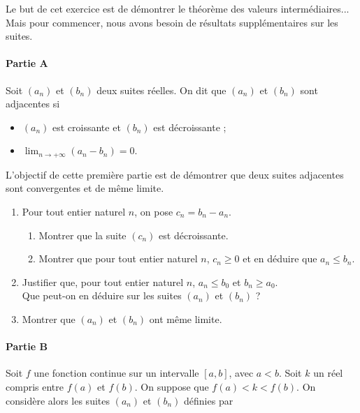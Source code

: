 \documentclass[11pt,fleqn, openany]{book} %
\begin{document}
\begin{exercise}[topic=cont03, subtitle={(Démontrer le théorème des valeurs intermédiaires)}]

Le but de cet exercice est de démontrer le théorème des valeurs intermédiaires... Mais pour commencer, nous avons besoin de résultats supplémentaires sur les suites.

\paragraph{Partie A}

Soit $(a_n)$ et $(b_n)$ deux suites réelles. On dit que $(a_n)$ et $(b_n)$ sont adjacentes si
\begin{itemize}
\item $(a_n)$ est croissante et $(b_n)$ est décroissante ;
\item $\displaystyle \lim_{n \to + \infty} (a_n-b_n)=0$.
\end{itemize}
L'objectif de cette première partie est de démontrer que deux suites adjacentes sont convergentes et de même limite.

\begin{enumerate}
\item Pour tout entier naturel $n$, on pose $c_n = b_n-a_n$.
\begin{enumerate}
\item Montrer que la suite $(c_n)$ est décroissante.
\item Montrer que pour tout entier naturel $n$, $c_n \geqslant 0$ et en déduire que $a_n \leqslant b_n$.
\end{enumerate}
\item Justifier que, pour tout entier naturel $n$, $a_n \leqslant b_0$ et $b_n \geqslant a_0$. \\ Que peut-on en déduire sur les suites $(a_n)$ et $(b_n)$ ?
\item Montrer que $(a_n)$ et $(b_n)$ ont même limite.
\end{enumerate}

\paragraph{Partie B}

Soit $f$ une fonction continue sur un intervalle $[a,b]$, avec $a<b$. Soit $k$ un réel compris entre $f(a)$ et $f(b)$. On suppose que $f(a) < k < f(b)$. On considère alors les suites $(a_n)$ et $(b_n)$ définies par


\end{exercise}
\end{document}
